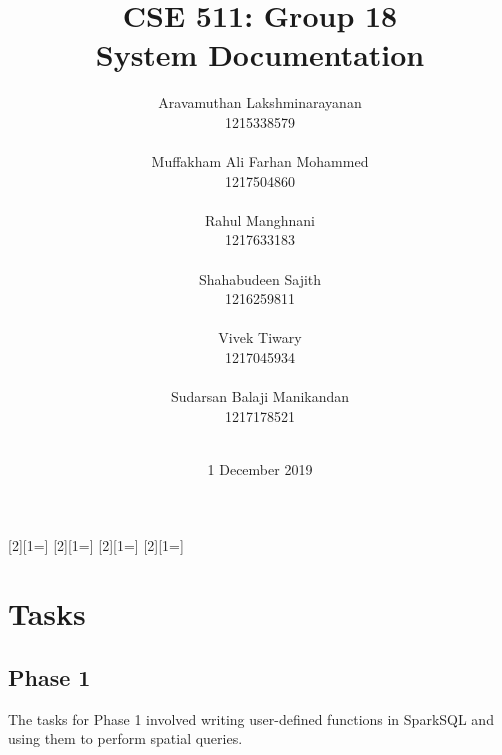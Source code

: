 \usepackage[colorinlistoftodos,prependcaption,textsize=footnotesize]{todonotes}
[2][1=]{\textcolor{Red}
{}}
[2][1=]{\textcolor{Blue}
{}}
[2][1=]{\textcolor{OliveGreen}{}}
[2][1=]{\textcolor{Plum}{}}





\title{
{\Huge CSE 511: Group 18{\large\linebreak\\} System Documentation{\large\linebreak\\}}
}
\author{
Aravamuthan Lakshminarayanan\\
1215338579\\\\
Muffakham Ali Farhan Mohammed\\
1217504860\\\\
Rahul Manghnani\\
1217633183\\\\
Shahabudeen Sajith\\
1216259811\\\\
Vivek Tiwary\\
1217045934\\\\
Sudarsan Balaji Manikandan\\
1217178521\\\\
}
\date{1 December 2019}
\maketitle
\newpage


\tableofcontents\label{c}
\newpage

\section{Tasks} \label{Tasks}
	\subsection{Phase 1} \label{Phase 1}
    The tasks for Phase 1 involved writing user-defined functions in SparkSQL and using them to perform spatial queries.\\

